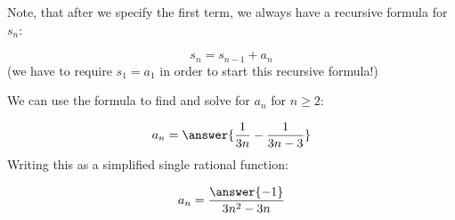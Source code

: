 \documentclass{ximera}
\begin{document}
\begin{exercise}
\begin{hint}
Note, that after we specify the first term, we always have a recursive formula for $s_n$:

\[
s_n = s_{n-1}+a_n
\]
(we have to require $s_1=a_1$ in order to start this recursive formula!)

We can use the formula to find  and solve for $a_n$ for $n \geq 2$:

\[
a_n = \answer{\frac{1}{3n}-\frac{1}{3n-3}}
\]
Writing this as a simplified single rational function:

\[
a_n = \frac{\answer{-1}}{3n^2-3n}
\]

\end{hint}
\end{exercise}
\end{document}

